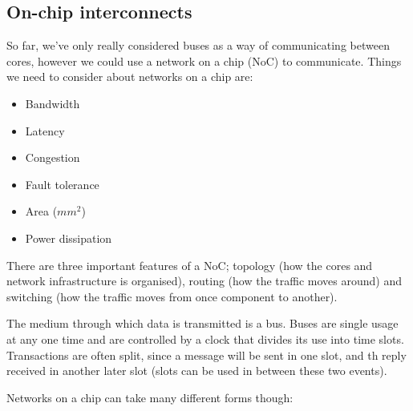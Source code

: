 \subsection{On-chip interconnects}

So far, we've only really considered buses as a way of communicating between
cores, however we could use a network on a chip (NoC) to communicate. Things we
need to consider about networks on a chip are:

\begin{mymulticols}
  \begin{itemize}
    \item Bandwidth
    \item Latency
    \item Congestion
    \item Fault tolerance
    \item Area ($mm^2$)
    \item Power dissipation
  \end{itemize}
\end{mymulticols}

There are three important features of a NoC; topology (how the cores and network
infrastructure is organised), routing (how the traffic moves around) and
switching (how the traffic moves from once component to another).

The medium through which data is transmitted is a bus. Buses are single usage at
any one time and are controlled by a clock that divides its use into time slots.
Transactions are often split, since a message will be sent in one slot, and th
reply received in another later slot (slots can be used in between these two
events).

Networks on a chip can take many different forms though:

